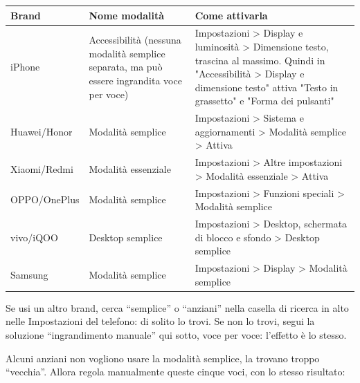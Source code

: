 
\begin{center}
\begin{tabularx}{\linewidth}{|X|X|X|}
\hline
\textbf{Brand} & \textbf{Nome modalità} & \textbf{Come attivarla} \tabularnewline
\hline
iPhone & Accessibilità (nessuna modalità semplice separata, ma può essere ingrandita voce per voce) & Impostazioni > Display e luminosità > Dimensione testo, trascina al massimo. Quindi in "Accessibilità > Display e dimensione testo" attiva "Testo in grassetto" e "Forma dei pulsanti" \tabularnewline
Huawei/Honor & Modalità semplice & Impostazioni > Sistema e aggiornamenti > Modalità semplice > Attiva \tabularnewline
Xiaomi/Redmi & Modalità essenziale & Impostazioni > Altre impostazioni > Modalità essenziale > Attiva \tabularnewline
OPPO/OnePlus & Modalità semplice & Impostazioni > Funzioni speciali > Modalità semplice \tabularnewline
vivo/iQOO & Desktop semplice & Impostazioni > Desktop, schermata di blocco e sfondo > Desktop semplice \tabularnewline
Samsung & Modalità semplice & Impostazioni > Display > Modalità semplice \tabularnewline
\hline
\end{tabularx}
\end{center}

Se usi un altro brand, cerca “semplice” o “anziani” nella casella di ricerca in alto nelle Impostazioni del telefono: di solito lo trovi. Se non lo trovi, segui la soluzione “ingrandimento manuale” qui sotto, voce per voce: l'effetto è lo stesso.


Alcuni anziani non vogliono usare la modalità semplice, la trovano troppo “vecchia”. Allora regola manualmente queste cinque voci, con lo stesso risultato:

